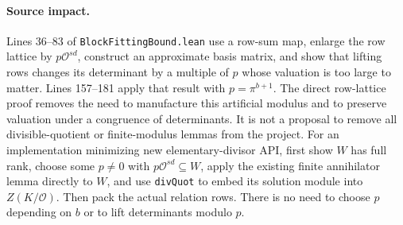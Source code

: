 \documentclass[11pt]{article}
\theoremstyle{remark}\newtheorem{remark}[theorem]{Remark}
\newcommand{\Ocal}{\mathcal O}
\begin{document}
\paragraph{Source impact.} Lines 36--83 of \texttt{BlockFittingBound.lean} use a row-sum map, enlarge the row lattice by $p\Ocal^{sd}$, construct an approximate basis matrix, and show that lifting rows changes its determinant by a multiple of $p$ whose valuation is too large to matter. Lines 157--181 apply that result with $p=\pi^{b+1}$. The direct row-lattice proof removes the need to manufacture this artificial modulus and to preserve valuation under a congruence of determinants. It is not a proposal to remove all divisible-quotient or finite-modulus lemmas from the project. For an implementation minimizing new elementary-divisor API, first show $W$ has full rank, choose some $p\ne0$ with $p\Ocal^{sd}\subseteq W$, apply the existing finite annihilator lemma directly to $W$, and use \texttt{divQuot} to embed its solution module into $Z(K/\Ocal)$. Then pack the actual relation rows. There is no need to choose $p$ depending on $b$ or to lift determinants modulo $p$.
\end{document}
